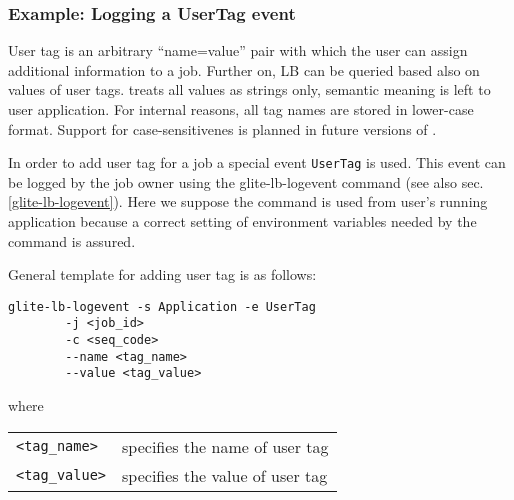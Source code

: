 %
%
\subsubsection{Example: Logging a UserTag event}
\label{e:usertag}

User tag is an arbitrary ``name=value'' pair with which the user can assign
additional information to a job. Further on, LB can be queried based also on
values of user tags. \LB treats all values as strings only, semantic meaning
is left to user application. For internal reasons, all tag names are stored 
in lower-case format. Support for case-sensitivenes is planned in future 
versions of \LB.

In order to add user tag for a job a special event \verb'UserTag' is used. This
event can be logged by the job owner using the glite-lb-logevent command (see
also sec.\ref{glite-lb-logevent}). Here we suppose the command is used from
user's running application because a correct setting of environment variables
needed by the command is assured.

General template for adding user tag is as follows:

\begin{verbatim}
glite-lb-logevent -s Application -e UserTag    
        -j <job_id>                         
        -c <seq_code>                       
        --name <tag_name>                   
        --value <tag_value>
\end{verbatim}

where

\begin{tabularx}{\textwidth}{lX}
\texttt{<tag\_name>}  & specifies the name of user tag \\
\texttt{<tag\_value>} & specifies the value of user tag \\
\end{tabularx}

